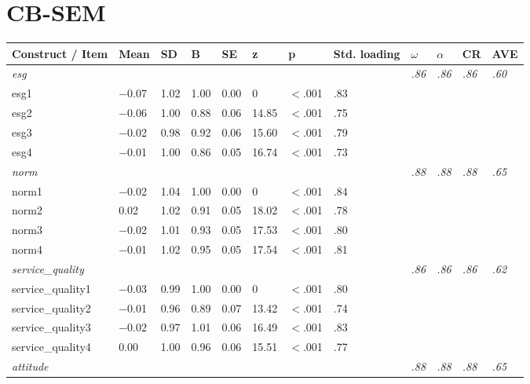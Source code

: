 \documentclass{article}
\begin{document}
\section{CB-SEM}

\begin{tabular}{llllllllllll}
\toprule
Construct / Item & Mean & SD & B & SE & z & p & Std. loading & $\omega$ & $\alpha$ & CR & AVE \\
\midrule
\textit{esg} & \textit{} & \textit{} & \textit{} & \textit{} & \textit{} & \textit{} & \textit{} & \textit{.86} & \textit{.86} & \textit{.86} & \textit{.60} \\
\quad esg1 & $-$0.07 & 1.02 & 1.00 & 0.00 & 0 & $<$.001 & .83 &  &  &  &  \\
\quad esg2 & $-$0.06 & 1.00 & 0.88 & 0.06 & 14.85 & $<$.001 & .75 &  &  &  &  \\
\quad esg3 & $-$0.02 & 0.98 & 0.92 & 0.06 & 15.60 & $<$.001 & .79 &  &  &  &  \\
\quad esg4 & $-$0.01 & 1.00 & 0.86 & 0.05 & 16.74 & $<$.001 & .73 &  &  &  &  \\
\textit{norm} & \textit{} & \textit{} & \textit{} & \textit{} & \textit{} & \textit{} & \textit{} & \textit{.88} & \textit{.88} & \textit{.88} & \textit{.65} \\
\quad norm1 & $-$0.02 & 1.04 & 1.00 & 0.00 & 0 & $<$.001 & .84 &  &  &  &  \\
\quad norm2 & 0.02 & 1.02 & 0.91 & 0.05 & 18.02 & $<$.001 & .78 &  &  &  &  \\
\quad norm3 & $-$0.02 & 1.01 & 0.93 & 0.05 & 17.53 & $<$.001 & .80 &  &  &  &  \\
\quad norm4 & $-$0.01 & 1.02 & 0.95 & 0.05 & 17.54 & $<$.001 & .81 &  &  &  &  \\
\textit{service\_quality} & \textit{} & \textit{} & \textit{} & \textit{} & \textit{} & \textit{} & \textit{} & \textit{.86} & \textit{.86} & \textit{.86} & \textit{.62} \\
\quad service\_quality1 & $-$0.03 & 0.99 & 1.00 & 0.00 & 0 & $<$.001 & .80 &  &  &  &  \\
\quad service\_quality2 & $-$0.01 & 0.96 & 0.89 & 0.07 & 13.42 & $<$.001 & .74 &  &  &  &  \\
\quad service\_quality3 & $-$0.02 & 0.97 & 1.01 & 0.06 & 16.49 & $<$.001 & .83 &  &  &  &  \\
\quad service\_quality4 & 0.00 & 1.00 & 0.96 & 0.06 & 15.51 & $<$.001 & .77 &  &  &  &  \\
\textit{attitude} & \textit{} & \textit{} & \textit{} & \textit{} & \textit{} & \textit{} & \textit{} & \textit{.88} & \textit{.88} & \textit{.88} & \textit{.65} \\

\end{tabular}
\end{document}
